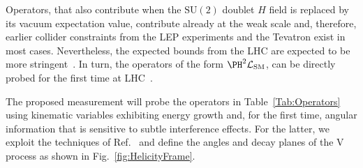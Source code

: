 \documentclass[a4paper,11pt]{article}
\renewcommand{\PV}{{{{V}}}\xspace}
\newcommand{\VH}{{{\PV}{\PH}}\xspace}
\begin{document}

Operators, that also contribute when the $\textrm{SU}(2)$ doublet $H$ field is replaced by its vacuum expectation value, contribute already at the weak scale and, therefore, earlier collider constraints from the LEP experiments and the Tevatron exist in most cases. 
Nevertheless, the expected bounds from the LHC are expected to be more stringent~\cite{Ellis:2014jta,Grojean:2018dqj}.
In turn, the operators of the form ${\PH}^2\mathcal{L}_{\text{SM}}$, can be directly probed for the first time at LHC~\cite{Gupta:2014rxa}. 


The proposed measurement will probe the operators in Table~\ref{Tab:Operators} 
using kinematic variables exhibiting energy growth and, for the first time, angular information that is sensitive to subtle interference effects.
For the latter, we exploit the techniques of Ref.~\cite{Banerjee:2019twi} and define the angles and decay planes of the \VH process as shown in Fig.~\ref{fig:HelicityFrame}.


\end{document}
